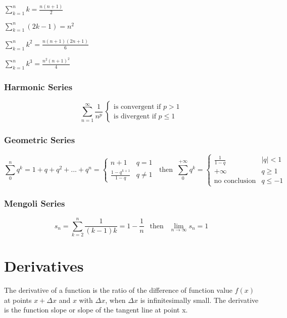 \begin{multicols}{2}
	
	$ \sum_{k=1}^n k = \frac{n(n+1)}{2} $
	
	$ \sum_{k=1}^n (2k-1) = n^2 $
	
	$ \sum_{k=1}^n k^2 = \frac{n(n+1)(2n+1)}{6} $
	
	$ \sum_{k=1}^n k^3 = \frac{n^2(n+1)^2}{4} $
	
\end{multicols}

\subsubsection{Harmonic Series}
\[
\sum_{n=1}^\infty \frac{1}{n^p} ~ \begin{cases}
									\text{is convergent if } p>1 \\
									\text{is divergent if } p\leq1
									\end{cases}
\]

\subsubsection{Geometric Series}
\[
\sum_{0}^{n}q^k=1+q+q^2+...+q^n= \begin{cases}
									n+1 & q=1 \\
									\frac{1-q^{k+1}}{1-q} & q\ne1
								 \end{cases}
~ \text{ then } ~
\sum_{0}^{+\infty}q^k= \begin{cases}
\frac{1}{1-q} & \left|q\right|<1 \\
+\infty & q\ge1 \\
\text{no conclusion} & q\le-1
\end{cases}
\]

\subsubsection{Mengoli Series}
\[
s_n=\sum_{k=2}^{n}\frac{1}{(k-1)k}=1-\frac{1}{n} ~~ \text{ then } ~~  \lim_{n\rightarrow\infty}s_n=1
\]

\section{Derivatives}
The derivative of a function is the ratio of the difference of function value $ f(x) $ at points $ x+\Delta x $ and $ x $ with $ \Delta x $, when $ \Delta x $ is infinitesimally small. The derivative is the function slope or slope of the tangent line at point x.

